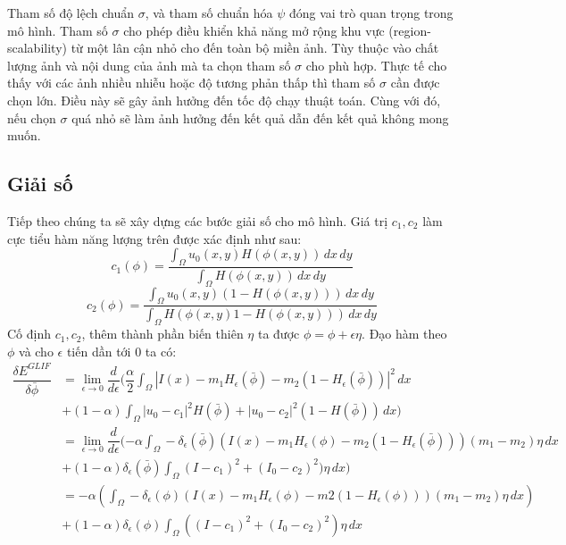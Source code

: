 \documentclass[12pt, oneside, a4paper]{book}
\begin{document}
Tham số độ lệch chuẩn $\sigma$, và tham số chuẩn hóa $\psi$ đóng vai trò quan trọng trong mô hình.  Tham số $\sigma$ cho phép điều khiển khả năng mở rộng khu vực (region-scalability) từ một lân cận nhỏ cho đến toàn bộ miền ảnh. Tùy thuộc vào chất lượng ảnh và nội dung của ảnh mà ta chọn tham số $\sigma$ cho phù hợp. Thực tế cho thấy với các ảnh nhiều nhiễu hoặc độ tương phản thấp thì tham số $\sigma$ cần được chọn lớn. Điều này sẽ gây  ảnh hưởng đến tốc độ chạy thuật toán. Cùng với đó, nếu chọn $\sigma$ quá nhỏ sẽ làm ảnh hưởng đến kết quả dẫn đến kết quả không mong muốn.
\subsection{Giải số}
Tiếp theo chúng ta sẽ xây dựng các bước giải số cho mô hình. Giá trị $c_1, c_2$ làm cực tiểu hàm năng lượng trên được xác định như sau:
\begin{equation}
c_1(\phi)=\dfrac{\int_{\Omega}u_0(x,y)H(\phi(x,y))\,dx \,dy}{\int_{\Omega}H(\phi(x,y))\,dx\,dy}
\end{equation}
\begin{equation}
c_2(\phi)=\dfrac{\int_{\Omega}u_0(x,y)(1-H(\phi(x,y)))\,dx \,dy}{\int_{\Omega}H(\phi(x,y)1-H(\phi(x,y)))\,dx\,dy}
\end{equation}
Cố định $c_1, c_2$, thêm thành phần biến thiên $\eta$ ta được $\phi=\phi+\epsilon\eta$. Đạo hàm theo $\phi$ và cho $\epsilon$ tiến dần tới 0 ta có:
\begin{equation*}
\begin{split}
\dfrac{\delta E^{GLIF}}{\delta\bar{\phi} } &=\lim_{\epsilon \rightarrow 0}\dfrac{d}{d \epsilon}(\dfrac{\alpha}{2}\int_{\Omega}|I(x)-m_1H_{\epsilon}(\bar{\phi})-m_2(1-H_{\epsilon}(\bar{\phi}))|^2\,dx \\ 
&+(1-\alpha) \int_{\Omega} |u_0-c_1|^2H(\bar{\phi})+ |u_0-c_2|^2 (1-H(\bar{\phi})) \,dx)\\
&=\lim_{\epsilon \rightarrow 0}\dfrac{d}{d \epsilon}(-\alpha\int_{\Omega}-\delta_{\epsilon}(\bar{\phi})(I(x)-m_1H_{\epsilon}(\phi)-m_2(1-H_{\epsilon}(\bar{\phi})))(m_1-m_2)\eta\,dx \\ 
&+(1-\alpha)\delta_{\epsilon}(\bar{\phi})\int_{\Omega} (I-c_1)^2+ (I_0-c_2)^2)\eta \,dx)\\
&=-\alpha(\int_{\Omega}-\delta_{\epsilon}(\phi)(I(x)-m_1 H_{\epsilon}(\phi)-m2(1-H_{\epsilon}(\phi)))(m_1-m_2)\eta\,dx)\\
&+(1-\alpha)\delta_{\epsilon}(\phi)\int_{\Omega} ((I-c_1)^2+ (I_0-c_2)^2)\eta \,dx
\end{split}
\end{equation*}
\end{document}
